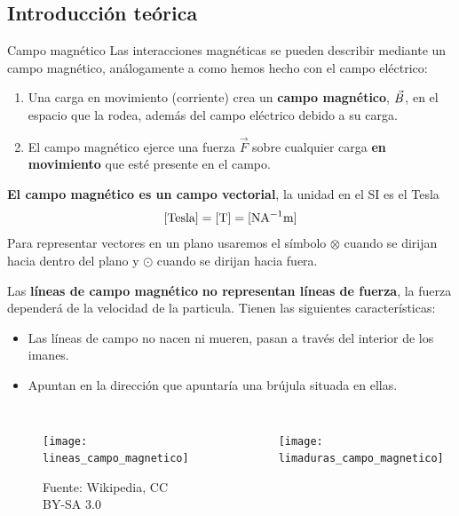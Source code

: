 \documentclass[]{presentation}
\begin{document}
\subsection{Introducción teórica}
\begin{frame}{Campo magnético}
Las interacciones magnéticas se pueden describir mediante un campo magnético,
análogamente a como hemos hecho con el campo eléctrico:
\begin{enumerate}
	\item Una carga en movimiento (corriente) crea un \textbf{campo magnético}, $\vec{B}$, en el espacio que la rodea, además del campo eléctrico debido a su carga.
	\item El campo magnético ejerce una fuerza $\vec{F}$ sobre cualquier carga \textbf{en movimiento} que esté presente en el campo.
\end{enumerate}
\textbf{El campo magnético es un campo vectorial}, la unidad en el SI es el Tesla
$$
[\text{Tesla}] = [\text{T}] = [\text{N} \text{A}^{-1} \text{m}]
$$
Para representar vectores en un plano usaremos el símbolo $\otimes$ cuando se dirijan hacia dentro del plano y $\odot$ cuando se dirijan hacia fuera.   
\end{frame}

\begin{frame}
Las \textbf{líneas de campo magnético} \textbf{no representan líneas de fuerza}, la fuerza dependerá de la velocidad de la particula. Tienen las siguientes características:
\begin{itemize}
\item Las líneas de campo no nacen ni mueren, pasan a través del interior de los imanes.        
\item Apuntan en la dirección que apuntaría una brújula situada en ellas.
\end{itemize}
\begin{columns}
\begin{figure}
	\centering
	\texttt{[image: lineas\_campo\_magnetico]}
	\caption{\tiny Fuente: Wikipedia, CC BY-SA 3.0}
\end{figure}
\begin{figure}
	\centering
	\texttt{[image: limaduras\_campo\_magnetico]}
\end{figure}
\end{columns}
\end{frame}
\end{document}
